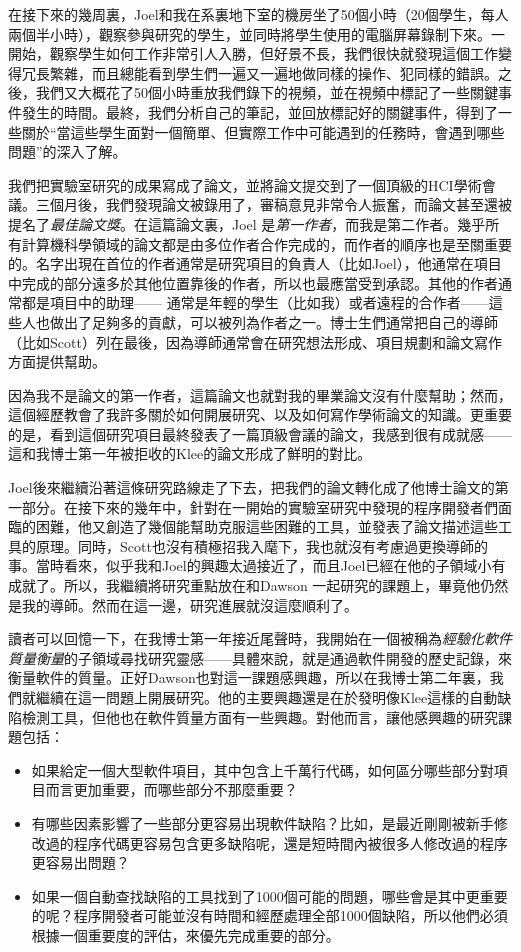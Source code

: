 \documentclass[12pt,UTF8,nofonts]{book}
\begin{document}
在接下來的幾周裏，Joel和我在系裏地下室的機房坐了50個小時（20個學生，每人兩個半小時），觀察參與研究的學生，並同時將學生使用的電腦屏幕錄制下來。一開始，觀察學生如何工作非常引人入勝，但好景不長，我們很快就發現這個工作變得冗長繁雜，而且總能看到學生們一遍又一遍地做同樣的操作、犯同樣的錯誤。之後，我們又大概花了50個小時重放我們錄下的視頻，並在視頻中標記了一些關鍵事件發生的時間。最終，我們分析自己的筆記，並回放標記好的關鍵事件，得到了一些關於“當這些學生面對一個簡單、但實際工作中可能遇到的任務時，會遇到哪些問題”的深入了解。

我們把實驗室研究的成果寫成了論文，並將論文提交到了一個頂級的HCI學術會議。三個月後，我們發現論文被錄用了，審稿意見非常令人振奮，而論文甚至還被提名了\emph{最佳論文獎}。在這篇論文裏，Joel 是\emph{第一作者}，而我是第二作者。幾乎所有計算機科學領域的論文都是由多位作者合作完成的，而作者的順序也是至關重要的。名字出現在首位的作者通常是研究項目的負責人（比如Joel），他通常在項目中完成的部分遠多於其他位置靠後的作者，所以也最應當受到承認。其他的作者通常都是項目中的助理—— 通常是年輕的學生（比如我）或者遠程的合作者——這些人也做出了足夠多的貢獻，可以被列為作者之一。博士生們通常把自己的導師（比如Scott）列在最後，因為導師通常會在研究想法形成、項目規劃和論文寫作方面提供幫助。

因為我不是論文的第一作者，這篇論文也就對我的畢業論文沒有什麼幫助；然而，這個經歷教會了我許多關於如何開展研究、以及如何寫作學術論文的知識。更重要的是，看到這個研究項目最終發表了一篇頂級會議的論文，我感到很有成就感——這和我博士第一年被拒收的Klee的論文形成了鮮明的對比。

Joel後來繼續沿著這條研究路線走了下去，把我們的論文轉化成了他博士論文的第一部分。在接下來的幾年中，針對在一開始的實驗室研究中發現的程序開發者們面臨的困難，他又創造了幾個能幫助克服這些困難的工具，並發表了論文描述這些工具的原理。同時，Scott也沒有積極招我入麾下，我也就沒有考慮過更換導師的事。當時看來，似乎我和Joel的興趣太過接近了，而且Joel已經在他的子領域小有成就了。所以，我繼續將研究重點放在和Dawson 一起研究的課題上，畢竟他仍然是我的導師。然而在這一邊，研究進展就沒這麼順利了。

\breakline

讀者可以回憶一下，在我博士第一年接近尾聲時，我開始在一個被稱為\emph{經驗化軟件質量衡量}的子領域尋找研究靈感——具體來說，就是通過軟件開發的歷史記錄，來衡量軟件的質量。正好Dawson也對這一課題感興趣，所以在我博士第二年裏，我們就繼續在這一問題上開展研究。他的主要興趣還是在於發明像Klee這樣的自動缺陷檢測工具，但他也在軟件質量方面有一些興趣。對他而言，讓他感興趣的研究課題包括：

\begin{itemize}
\item 如果給定一個大型軟件項目，其中包含上千萬行代碼，如何區分哪些部分對項目而言更加重要，而哪些部分不那麼重要？
\item 有哪些因素影響了一些部分更容易出現軟件缺陷？比如，是最近剛剛被新手修改過的程序代碼更容易包含更多缺陷呢，還是短時間內被很多人修改過的程序更容易出問題？
\item 如果一個自動查找缺陷的工具找到了1000個可能的問題，哪些會是其中更重要的呢？程序開發者可能並沒有時間和經歷處理全部1000個缺陷，所以他們必須根據一個重要度的評估，來優先完成重要的部分。
\end{itemize}
\end{document}
